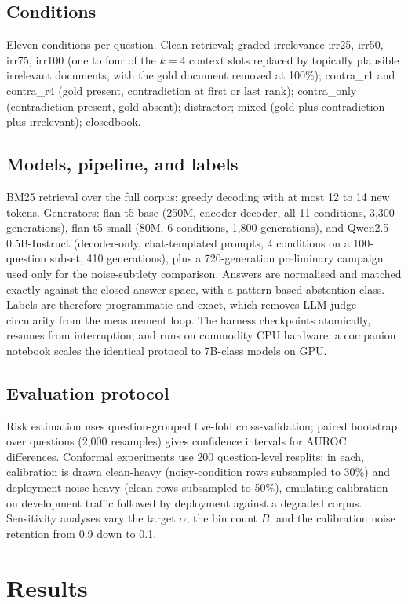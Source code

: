 \documentclass[11pt]{article}
\begin{document}
\subsection{Conditions}
Eleven conditions per question. Clean retrieval; graded irrelevance
irr25, irr50, irr75, irr100 (one to four of the $k = 4$ context slots
replaced by topically plausible irrelevant documents, with the gold
document removed at 100\%); contra\_r1 and contra\_r4 (gold present,
contradiction at first or last rank); contra\_only (contradiction
present, gold absent); distractor; mixed (gold plus contradiction plus
irrelevant); closedbook.

\subsection{Models, pipeline, and labels}
BM25 retrieval over the full corpus; greedy decoding with at most 12 to
14 new tokens. Generators: flan-t5-base (250M, encoder-decoder, all 11
conditions, 3{,}300 generations), flan-t5-small (80M, 6 conditions,
1{,}800 generations), and Qwen2.5-0.5B-Instruct (decoder-only,
chat-templated prompts, 4 conditions on a 100-question subset, 410
generations), plus a 720-generation preliminary campaign used only for
the noise-subtlety comparison. Answers are normalised and matched
exactly against the closed answer space, with a pattern-based
abstention class. Labels are therefore programmatic and exact, which
removes LLM-judge circularity from the measurement loop. The harness
checkpoints atomically, resumes from interruption, and runs on
commodity CPU hardware; a companion notebook scales the identical
protocol to 7B-class models on GPU.

\subsection{Evaluation protocol}
Risk estimation uses question-grouped five-fold cross-validation;
paired bootstrap over questions (2{,}000 resamples) gives confidence
intervals for AUROC differences. Conformal experiments use 200
question-level resplits; in each, calibration is drawn clean-heavy
(noisy-condition rows subsampled to 30\%) and deployment noise-heavy
(clean rows subsampled to 50\%), emulating calibration on development
traffic followed by deployment against a degraded corpus. Sensitivity
analyses vary the target $\alpha$, the bin count $B$, and the
calibration noise retention from 0.9 down to 0.1.

\section{Results}\label{sec:results}
\end{document}
